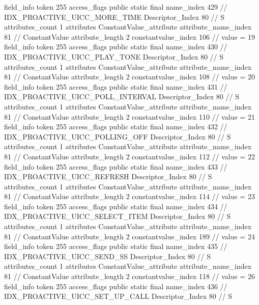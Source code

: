 {{{{{			}
			field_info {
				token	255
				access_flags	public static final
				name_index	429		// IDX_PROACTIVE_UICC_MORE_TIME
				Descriptor_Index	80		// S
				attributes_count	1
				attributes {
				ConstantValue_attribute {
					attribute_name_index	81		// ConstantValue
					attribute_length	2
					constantvalue_index	106		// value = 19
				}
				}
			}
			field_info {
				token	255
				access_flags	public static final
				name_index	430		// IDX_PROACTIVE_UICC_PLAY_TONE
				Descriptor_Index	80		// S
				attributes_count	1
				attributes {
				ConstantValue_attribute {
					attribute_name_index	81		// ConstantValue
					attribute_length	2
					constantvalue_index	108		// value = 20
				}
				}
			}
			field_info {
				token	255
				access_flags	public static final
				name_index	431		// IDX_PROACTIVE_UICC_POLL_INTERVAL
				Descriptor_Index	80		// S
				attributes_count	1
				attributes {
				ConstantValue_attribute {
					attribute_name_index	81		// ConstantValue
					attribute_length	2
					constantvalue_index	110		// value = 21
				}
				}
			}
			field_info {
				token	255
				access_flags	public static final
				name_index	432		// IDX_PROACTIVE_UICC_POLLING_OFF
				Descriptor_Index	80		// S
				attributes_count	1
				attributes {
				ConstantValue_attribute {
					attribute_name_index	81		// ConstantValue
					attribute_length	2
					constantvalue_index	112		// value = 22
				}
				}
			}
			field_info {
				token	255
				access_flags	public static final
				name_index	433		// IDX_PROACTIVE_UICC_REFRESH
				Descriptor_Index	80		// S
				attributes_count	1
				attributes {
				ConstantValue_attribute {
					attribute_name_index	81		// ConstantValue
					attribute_length	2
					constantvalue_index	114		// value = 23
				}
				}
			}
			field_info {
				token	255
				access_flags	public static final
				name_index	434		// IDX_PROACTIVE_UICC_SELECT_ITEM
				Descriptor_Index	80		// S
				attributes_count	1
				attributes {
				ConstantValue_attribute {
					attribute_name_index	81		// ConstantValue
					attribute_length	2
					constantvalue_index	189		// value = 24
				}
				}
			}
			field_info {
				token	255
				access_flags	public static final
				name_index	435		// IDX_PROACTIVE_UICC_SEND_SS
				Descriptor_Index	80		// S
				attributes_count	1
				attributes {
				ConstantValue_attribute {
					attribute_name_index	81		// ConstantValue
					attribute_length	2
					constantvalue_index	118		// value = 26
				}
				}
			}
			field_info {
				token	255
				access_flags	public static final
				name_index	436		// IDX_PROACTIVE_UICC_SET_UP_CALL
				Descriptor_Index	80		// S
}}}}}
